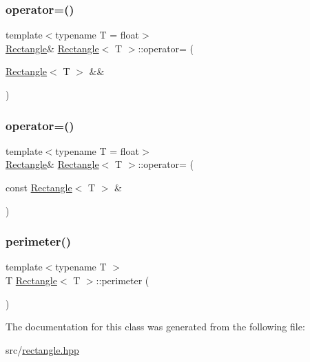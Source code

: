 \subsubsection{\texorpdfstring{operator=()}{operator=()}\hspace{0.1cm}{\footnotesize\ttfamily [1/2]}}
{\footnotesize\ttfamily template$<$typename T  = float$>$ \\
\mbox{\hyperlink{classRectangle}{Rectangle}}\& \mbox{\hyperlink{classRectangle}{Rectangle}}$<$ T $>$\+::operator= (\begin{DoxyParamCaption}\item[{\mbox{\hyperlink{classRectangle}{Rectangle}}$<$ T $>$ \&\&}]{ }\end{DoxyParamCaption})\hspace{0.3cm}{\ttfamily [default]}}

\mbox{\label{classRectangle_ad0a038c8959e5bde09bf1e8f49980bea}} 
\subsubsection{\texorpdfstring{operator=()}{operator=()}\hspace{0.1cm}{\footnotesize\ttfamily [2/2]}}
{\footnotesize\ttfamily template$<$typename T  = float$>$ \\
\mbox{\hyperlink{classRectangle}{Rectangle}}\& \mbox{\hyperlink{classRectangle}{Rectangle}}$<$ T $>$\+::operator= (\begin{DoxyParamCaption}\item[{const \mbox{\hyperlink{classRectangle}{Rectangle}}$<$ T $>$ \&}]{ }\end{DoxyParamCaption})\hspace{0.3cm}{\ttfamily [default]}}

\mbox{\label{classRectangle_a9c59dcb7376296711ad86e2da924d3c8}} 
\subsubsection{\texorpdfstring{perimeter()}{perimeter()}}
{\footnotesize\ttfamily template$<$typename T $>$ \\
T \mbox{\hyperlink{classRectangle}{Rectangle}}$<$ T $>$\+::perimeter (\begin{DoxyParamCaption}{ }\end{DoxyParamCaption})}



The documentation for this class was generated from the following file\+:\begin{DoxyCompactItemize}
\item 
src/\mbox{\hyperlink{rectangle_8hpp}{rectangle.\+hpp}}\end{DoxyCompactItemize}
